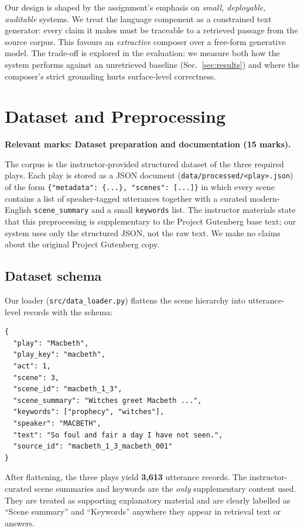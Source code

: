 \documentclass[10pt,twocolumn,a4paper]{article}
\begin{document}
Our design is shaped by the assignment's emphasis on
\emph{small, deployable, auditable} systems. We treat the language
component as a constrained text generator: every claim it makes must be
traceable to a retrieved passage from the source corpus. This favours an
\emph{extractive} composer over a free-form generative model. The
trade-off is explored in the evaluation: we measure both how the system
performs against an unretrieved baseline (Sec.~\ref{sec:results}) and
where the composer's strict grounding hurts surface-level correctness.

\section{Dataset and Preprocessing}
\label{sec:dataset}

\textbf{Relevant marks: Dataset preparation and documentation (15 marks).}

The corpus is the instructor-provided structured dataset of the three
required plays. Each play is stored as a JSON document
(\verb|data/processed/<play>.json|) of the form
\verb|{"metadata": {...}, "scenes": [...]}| in which every scene
contains a list of speaker-tagged utterances together with a curated
modern-English \verb|scene_summary| and a small \verb|keywords| list.
The instructor materials state that this preprocessing is supplementary
to the Project Gutenberg base text; our system uses only the structured
JSON, not the raw text. We make no claims about the original Project
Gutenberg copy.

\subsection{Dataset schema}

Our loader (\verb|src/data_loader.py|) flattens the scene hierarchy into
utterance-level records with the schema:

\begin{verbatim}
{
  "play": "Macbeth",
  "play_key": "macbeth",
  "act": 1,
  "scene": 3,
  "scene_id": "macbeth_1_3",
  "scene_summary": "Witches greet Macbeth ...",
  "keywords": ["prophecy", "witches"],
  "speaker": "MACBETH",
  "text": "So foul and fair a day I have not seen.",
  "source_id": "macbeth_1_3_macbeth_001"
}
\end{verbatim}

After flattening, the three plays yield \textbf{3{,}613} utterance
records. The instructor-curated scene summaries and keywords are the
\emph{only} supplementary content used. They are treated as supporting
explanatory material and are clearly labelled as ``Scene summary'' and
``Keywords'' anywhere they appear in retrieval text or answers.
\end{document}

